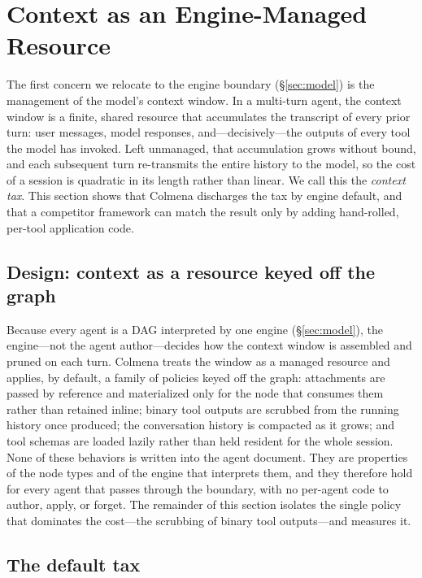 \section{Context as an Engine-Managed Resource}
\label{sec:context}

The first concern we relocate to the engine boundary
(\S\ref{sec:model}) is the management of the model's context window. In a
multi-turn agent, the context window is a finite, shared resource that
accumulates the transcript of every prior turn: user messages, model
responses, and---decisively---the outputs of every tool the model has
invoked. Left unmanaged, that accumulation grows without bound, and each
subsequent turn re-transmits the entire history to the model, so the cost
of a session is quadratic in its length rather than linear. We call this
the \emph{context tax}. This section shows that Colmena discharges the tax
by engine default, and that a competitor framework can match the result
only by adding hand-rolled, per-tool application code.

\subsection{Design: context as a resource keyed off the graph}
\label{subsec:context-design}

Because every agent is a DAG interpreted by one engine
(\S\ref{sec:model}), the engine---not the agent author---decides how the
context window is assembled and pruned on each turn. Colmena treats the
window as a managed resource and applies, by default, a family of policies
keyed off the graph: attachments are passed by reference and materialized
only for the node that consumes them rather than retained inline;
binary tool outputs are scrubbed from the running history once produced;
the conversation history is compacted as it grows; and tool schemas are
loaded lazily rather than held resident for the whole session. None of
these behaviors is written into the agent document. They are properties of
the node types and of the engine that interprets them, and they therefore
hold for every agent that passes through the boundary, with no per-agent
code to author, apply, or forget. The remainder of this section isolates
the single policy that dominates the cost---the scrubbing of binary
tool outputs---and measures it.

\subsection{The default tax}
\label{subsec:context-default}

